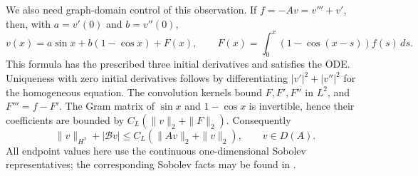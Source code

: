 \documentclass[11pt]{article}
\theoremstyle{remark}\newtheorem{remark}[theorem]{Remark}
\numberwithin{equation}{section}
\begin{document}
We also need graph-domain control of this observation. If $f=-Av=v'''+v'$,
then, with $a=v'(0)$ and $b=v''(0)$,
\[
 v(x)=a\sin x+b(1-\cos x)+F(x),\qquad
 F(x)=\int_0^x(1-\cos(x-s))f(s)\,ds.
\]
This formula has the prescribed three initial derivatives and satisfies the
ODE. Uniqueness with zero initial derivatives follows by differentiating
$|v'|^2+|v''|^2$ for the homogeneous equation.
The convolution kernels bound $F,F',F''$ in $L^2$, and $F'''=f-F'$.
The Gram matrix of $\sin x$ and $1-\cos x$ is invertible, hence their
coefficients are bounded by $C_L(\|v\|_2+\|F\|_2)$. Consequently
\begin{equation}\label{eq:graph}
 \|v\|_{H^3}+|\mathcal Bv|\le C_L(\|Av\|_2+\|v\|_2),\qquad v\in D(A).
\end{equation}
All endpoint values here use the continuous one-dimensional Sobolev
representatives; the corresponding Sobolev facts may be found in
\cite[Theorems 8.2, 8.8 and 8.12]{Brezis}.
\end{document}
